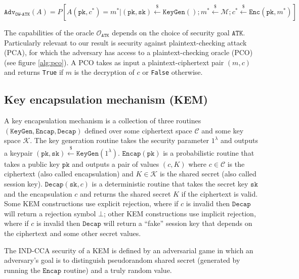 \documentclass[floatrow,journal=tches,submission]{iacrtrans}
\newcommand{\keygen}{\texttt{KeyGen}}
\newcommand{\encrypt}{\texttt{Enc}}
\newcommand{\encap}{\texttt{Encap}}
\newcommand{\decap}{\texttt{Decap}}
\newcommand{\pk}{\texttt{pk}}
\newcommand{\sk}{\texttt{sk}}
\newcommand{\leftsample}{\stackrel{\$}{\leftarrow}}
\newcommand{\adv}{\texttt{Adv}}
\begin{document}
\begin{equation*}
    \adv_\texttt{OW-ATK}(A) = P\left[
        A(\pk, c^\ast) = m^\ast \vert
        (\pk, \sk) \leftsample \keygen() ;
        m^\ast \leftsample \mathcal{M};
        c^\ast \leftsample \encrypt(\pk, m^\ast)
    \right]
\end{equation*}

The capabilities of the oracle $\mathcal{O}_\texttt{ATK}$ depends on the choice of security goal $\texttt{ATK}$. Particularly relevant to our result is security against plaintext-checking attack (PCA), for which the adversary has access to a plaintext-checking oracle (PCO) (see figure \ref{alg:pco}). A PCO takes as input a plaintext-ciphertext pair $(m, c)$ and returns \texttt{True} if $m$ is the decryption of $c$ or \texttt{False} otherwise.

\subsection{Key encapsulation mechanism (KEM)}
A key encapsulation mechanism is a collection of three routines $(\keygen, \encap, \decap)$ defined over some ciphertext space $\mathcal{C}$ and some key space $\mathcal{K}$. The key generation routine takes the security parameter $1^\lambda$ and outputs a keypair $(\pk, \sk) \leftsample \keygen(1^\lambda)$. $\encap(\pk)$ is a probabilistic routine that takes a public key $\pk$ and outputs a pair of values $(c, K)$ where $c \in \mathcal{C}$ is the ciphertext (also called encapsulation) and $K \in \mathcal{K}$ is the shared secret (also called session key). $\decap(\sk, c)$ is a deterministic routine that takes the secret key $\sk$ and the encapsulation $c$ and returns the shared secret $K$ if the ciphertext is valid. Some KEM constructions use explicit rejection, where if $c$ is invalid then $\decap$ will return a rejection symbol $\bot$; other KEM constructions use implicit rejection, where if $c$ is invalid then $\decap$ will return a ``fake'' session key that depends on the ciphertext and some other secret values.

The IND-CCA security of a KEM is defined by an adversarial game in which an adversary's goal is to distinguish pseudorandom shared secret (generated by running the $\encap$ routine) and a truly random value.
\end{document}
